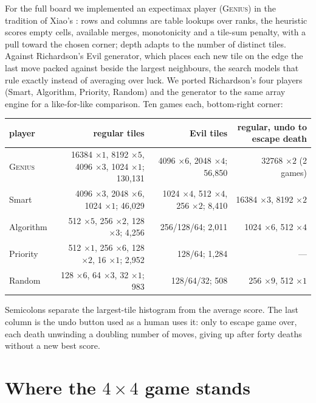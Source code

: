 \documentclass[11pt]{article}
\theoremstyle{definition}
\theoremstyle{remark}
\begin{document}
For the full board we implemented an expectimax player (\textsc{Genius})
in the tradition of Xiao's \cite{nneonneo2014}: rows and columns are
table lookups over ranks, the heuristic scores empty cells, available
merges, monotonicity and a tile-sum penalty, with a pull toward the chosen
corner; depth adapts to the number of distinct tiles. Against Richardson's
\cite{richardson2014} Evil generator, which places each new tile on the
edge the last move packed against beside the largest neighbours, the
search models that rule exactly instead of averaging over luck. We ported
Richardson's four players (Smart, Algorithm, Priority, Random) and the
generator to the same array engine for a like-for-like comparison. Ten
games each, bottom-right corner:

\begin{center}\scriptsize\setlength{\tabcolsep}{3pt}
\begin{tabular}{@{}lrrr@{}}
\toprule
player & regular tiles & Evil tiles & regular, undo to escape death \\
\midrule
\textsc{Genius} & 16384 $\times1$, 8192 $\times5$, 4096 $\times3$, 1024 $\times1$; 130{,}131 & 4096 $\times6$, 2048 $\times4$; 56{,}850 & 32768 $\times2$ (2 games) \\
Smart & 4096 $\times3$, 2048 $\times6$, 1024 $\times1$; 46{,}029 & 1024 $\times4$, 512 $\times4$, 256 $\times2$; 8{,}410 & 16384 $\times3$, 8192 $\times2$ \\
Algorithm & 512 $\times5$, 256 $\times2$, 128 $\times3$; 4{,}256 & 256/128/64; 2{,}011 & 1024 $\times6$, 512 $\times4$ \\
Priority & 512 $\times1$, 256 $\times6$, 128 $\times2$, 16 $\times1$; 2{,}952 & 128/64; 1{,}284 & --- \\
Random & 128 $\times6$, 64 $\times3$, 32 $\times1$; 983 & 128/64/32; 508 & 256 $\times9$, 512 $\times1$ \\
\bottomrule
\end{tabular}
\end{center}

Semicolons separate the largest-tile histogram from the average score. The
last column is the undo button used as a human uses it: only to escape
game over, each death unwinding a doubling number of moves, giving up
after forty deaths without a new best score.

\section{Where the \texorpdfstring{$4\times4$}{4x4} game stands}\label{sec:recent}
\end{document}
